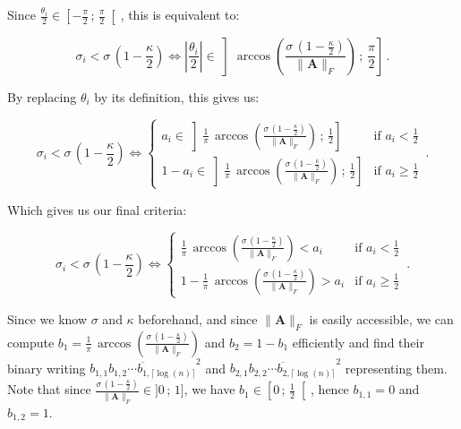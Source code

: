 \documentclass[11pt, a4paper]{article}
\begin{document}
            Since \(\frac{\theta_i}{2}\in\left[-\frac\pi2\,;\,\frac\pi2\right[\), this is equivalent to:
            
            \[\sigma_i < \sigma\,\left(1 - \frac\kappa2\right)\iff\left|\frac{\theta_i}{2}\right|\in\left]\arccos\left(\frac{\sigma\,\left(1 - \frac\kappa2\right)}{\|\mathbf{A}\|_F}\right)\,;\,\frac\pi2\right]\,.\]
            
            By replacing \(\theta_i\) by its definition, this gives us:
            
            \[\sigma_i < \sigma\,\left(1 - \frac\kappa2\right)\iff\begin{cases}a_i\in\left]\frac1\pi\,\arccos\left(\frac{\sigma\,\left(1 - \frac\kappa2\right)}{\|\mathbf{A}\|_F}\right)\,;\,\frac12\right]&\text{if }a_i<\frac12\\1-a_i\in\left]\frac1\pi\,\arccos\left(\frac{\sigma\,\left(1 - \frac\kappa2\right)}{\|\mathbf{A}\|_F}\right)\,;\,\frac12\right]&\text{if }a_i\geqslant\frac12\end{cases}\,.\]
            
            Which gives us our final criteria:
            
            \[\sigma_i < \sigma\,\left(1 - \frac\kappa2\right)\iff\begin{cases}\frac1\pi\,\arccos\left(\frac{\sigma\,\left(1 - \frac\kappa2\right)}{\|\mathbf{A}\|_F}\right) < a_i&\text{if }a_i<\frac12\\1-\frac1\pi\,\arccos\left(\frac{\sigma\,\left(1 - \frac\kappa2\right)}{\|\mathbf{A}\|_F}\right) > a_i&\text{if }a_i\geqslant\frac12\end{cases}\,.\]
                        
            Since we know \(\sigma\) and \(\kappa\) beforehand, and since \(\|\mathbf{A}\|_F\) is easily accessible, we can compute \(b_1=\frac1\pi\,\arccos\left(\frac{\sigma\,\left(1 - \frac\kappa2\right)}{\|\mathbf{A}\|_F}\right)\) and \(b_2 = 1 - b_1\) efficiently and find their binary writing \(\overline{b_{1,1}b_{1, 2}\cdots b_{1,\lceil\log(n)\rceil}}^2\) and \(\overline{b_{2,1}b_{2, 2}\cdots b_{2,\lceil\log(n)\rceil}}^2\) representing them. Note that since \(\frac{\sigma\,\left(1 - \frac\kappa2\right)}{\|\mathbf{A}\|_F}\in]0\,;\,1]\), we have \(b_1\in\left[0\,;\,\frac12\right[\), hence \(b_{1,1}=0\) and \(b_{1,2}=1\).
            
\end{document}
